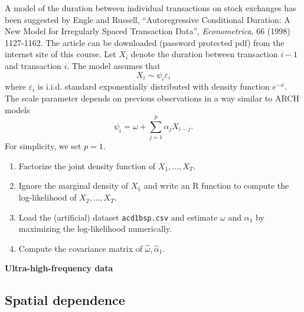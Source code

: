 \documentclass{article}
\begin{document}
A model of the duration between individual transactions on stock exchanges
has been suggested by Engle and Russell, \textquotedblleft Autoregressive
Conditional Duration: A New Model for Irregularly Spaced Transaction
Data\textquotedblright , \emph{Econometrica}, 66 (1998) 1127-1162. The
article can be downloaded (password protected pdf) from the internet site of
this course. Let $X_{i}$ denote the duration between transaction $i-1$ and
transaction $i$. The model assumes that%
\begin{equation*}
X_{i}\sim \psi _{i}\varepsilon _{i}
\end{equation*}%
where $\varepsilon _{i}$ is i.i.d. standard exponentially distributed with
density function $e^{-x}$. The scale parameter depends on previous
observations in a way similar to ARCH models%
\begin{equation*}
\psi _{i}=\omega +\sum_{j=1}^{p}\alpha _{j}X_{i-j}.
\end{equation*}%
For simplicity, we set $p=1$.

\begin{enumerate}\setlength{\itemsep}{0pt}
\item Factorize the joint density function of $X_{1},\ldots ,X_{T}$.

\item Ignore the marginal density of $X_{1}$ and write an R function to
compute the log-likelihood of $X_{2},\ldots ,X_{T}$.

\item Load the (artificial) dataset \texttt{acd1bsp.csv} and estimate $%
\omega $ and $\alpha _{1}$ by maximizing the log-likelihood numerically.

\item Compute the covariance matrix of $\hat{\omega},\hat{\alpha}_{1}$.
\end{enumerate}

\begin{solution}
\textbf{Ultra-high-frequency data}
\end{solution}


\subsection{Spatial dependence}
\end{document}

